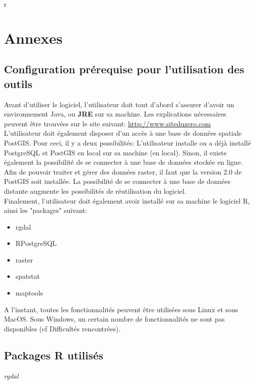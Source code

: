 r\chapter{Annexes}


\section{Configuration prérequise pour l'utilisation des outils }

Avant d'utiliser le logiciel, l'utilisateur doit tout d'abord s'assurer d'avoir un environnement Java, ou \textbf{JRE} sur sa machine. Les explications nécessaires peuvent être trouvées sur le site suivant: \url{http://www.siteduzero.com} \\

L'utilisateur doit également disposer d'un accès à une base de données spatiale PostGIS. Pour ceci, il y a deux possibilités: L'utilisateur installe ou a déjà installé PostgreSQL et PostGIS en local sur sa machine (en local). Sinon, il existe également la possibilité de se connecter à une base de données stockée en ligne. Afin de pouvoir traiter et gérer des données raster, il faut que la version 2.0 de PostGIS soit installée. La possibilité de se connecter à une base de données distante augmente les possibilités de réutilisation du logiciel.\\

Finalement, l'utilisateur doit également avoir installé sur sa machine le logiciel R, ainsi les "packages" suivant: \\
\begin{itemize}
\item rgdal
\item RPostgreSQL
\item raster
\item spatstat
\item maptools
\end{itemize}

A l'instant, toutes les fonctionnalités peuvent être utilisées sous Linux et sous MacOS. Sous Windows, un certain nombre de fonctionnalités ne sont pas disponibles (cf Difficultés rencontrées).

\section{Packages R utilisés}



\textit{rgdal\\}

